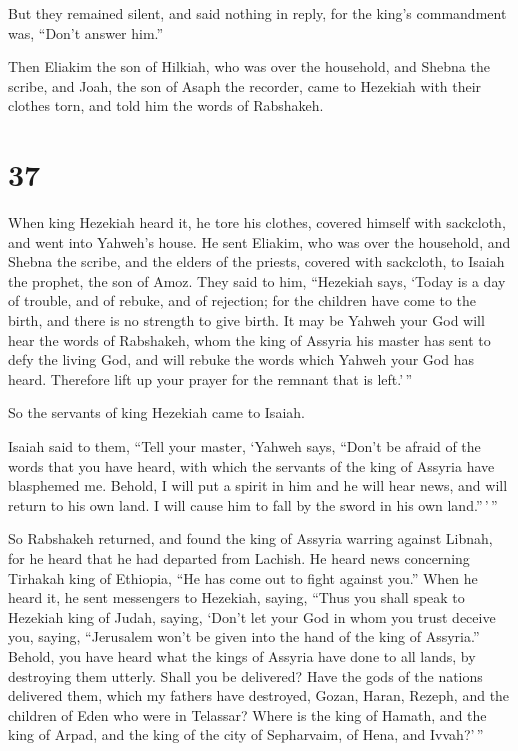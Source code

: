  But they remained silent, and said nothing in reply, for
the king's commandment was, ``Don't answer him.''

 Then Eliakim the son of Hilkiah, who was over the
household, and Shebna the scribe, and Joah, the son of Asaph the
recorder, came to Hezekiah with their clothes torn, and told him the
words of Rabshakeh.

\hypertarget{section-36}{%
\section{37}\label{section-36}}

 When king Hezekiah heard it, he tore his clothes, covered
himself with sackcloth, and went into Yahweh's house.  He
sent Eliakim, who was over the household, and Shebna the scribe, and the
elders of the priests, covered with sackcloth, to Isaiah the prophet,
the son of Amoz.  They said to him, ``Hezekiah says,
`Today is a day of trouble, and of rebuke, and of rejection; for the
children have come to the birth, and there is no strength to give birth.
 It may be Yahweh your God will hear the words of
Rabshakeh, whom the king of Assyria his master has sent to defy the
living God, and will rebuke the words which Yahweh your God has heard.
Therefore lift up your prayer for the remnant that is left.'\,''

 So the servants of king Hezekiah came to Isaiah.

 Isaiah said to them, ``Tell your master, `Yahweh says,
``Don't be afraid of the words that you have heard, with which the
servants of the king of Assyria have blasphemed me. 
Behold, I will put a spirit in him and he will hear news, and will
return to his own land. I will cause him to fall by the sword in his own
land.''\,'\,''

 So Rabshakeh returned, and found the king of Assyria
warring against Libnah, for he heard that he had departed from Lachish.
 He heard news concerning Tirhakah king of Ethiopia, ``He
has come out to fight against you.'' When he heard it, he sent
messengers to Hezekiah, saying,  ``Thus you shall speak
to Hezekiah king of Judah, saying, `Don't let your God in whom you trust
deceive you, saying, ``Jerusalem won't be given into the hand of the
king of Assyria.''  Behold, you have heard what the kings
of Assyria have done to all lands, by destroying them utterly. Shall you
be delivered?  Have the gods of the nations delivered
them, which my fathers have destroyed, Gozan, Haran, Rezeph, and the
children of Eden who were in Telassar?  Where is the king
of Hamath, and the king of Arpad, and the king of the city of
Sepharvaim, of Hena, and Ivvah?'\,''

